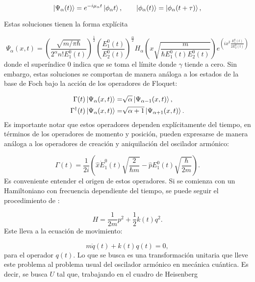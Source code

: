 \documentclass[a4paper,10pt]{report}
\begin{document}
\begin{equation}
\Ket{\Psi_\alpha (t)} = e^{-i\mu_\alpha t}\Ket{\phi_\alpha t}, \qquad \Ket{\phi_\alpha (t)}=\Ket{\phi_\alpha (t+\tau)},
\end{equation}

Estas soluciones tienen la forma explícita\cite{BrownPT}

\begin{equation}
\Psi_\alpha (x,t) = (\frac{\sqrt{m/\pi\hbar}}{2^\alpha n!E_1^0(t)})^{\frac{1}{2}}(\frac{E_1^0(t)}{E_2^0(t)})^\frac{\alpha}{2}H_\alpha(x\sqrt{\frac{m}{\hbar E_1^0(t) E_2^0(t)}})e^{(ix^2\frac{E_1^0(t)}{2E_2^0(t)})}
\end{equation} donde el superíndice 0 indica que se toma el límite donde $\gamma$ tiende a cero. Sin embargo, estas soluciones se comportan de manera análoga a los estados de la base de Foch bajo la acción de los operadores de Floquet:

\begin{align*}\label{FloquetOperators}
\Gamma(t) \Ket{\Psi_\alpha (x,t)} =& \sqrt{\alpha}\Ket{\Psi_{\alpha-1} (x,t)}, \\
\Gamma^\dagger(t) \Ket{\Psi_\alpha (x,t)} =& \sqrt{\alpha+1}\Ket{\Psi_{\alpha+1} (x,t)}.
\end{align*}Es importante notar que estos operadores dependen explícitamente del tiempo, en términos de los operadores de momento y posición, pueden expresarse de manera análoga a los operadores de creación y aniquilación del oscilador armónico:

\begin{equation}
\Gamma(t) = \frac{1}{2i}(\hat{x}\dot{E}_1^0(t)\sqrt{\frac{2}{\hbar m}}-\hat{p}E_1^0(t)\sqrt{\frac{\hbar}{2m}}).
\end{equation}Es conveniente entender el origen de estos operadores. Si se comienza con un Hamiltoniano con frecuencia dependiente del tiempo, se puede seguir el procedimiento de \cite{BrownPT}:

\begin{equation}\label{TDHO}
H = \frac{1}{2m}p^2 + \frac{1}{2}k(t)q^2.
\end{equation} Este lleva a la ecuación de movimiento:

\begin{equation}
m\ddot{q}(t) + k(t)q(t) = 0,
\end{equation} para el operador $q(t)$. Lo que se busca es una transformación unitaria que lleve este problema al problema usual del oscilador armónico en mecánica cuántica. Es decir, se busca $U$ tal que, trabajando en el cuadro de Heisenberg \cite{SakuraiQM}
\end{document}
